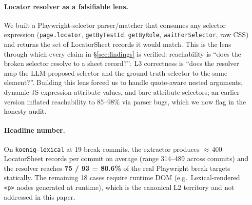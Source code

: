 \paragraph{Locator resolver as a falsifiable lens.}
We built a Playwright-selector parser/matcher that consumes any selector expression (\texttt{page.locator}, \texttt{getByTestId}, \texttt{getByRole}, \texttt{waitForSelector}, raw CSS) and returns the set of LocatorSheet records it would match. This is the lens through which every claim in \S\ref{sec:findings} is verified: reachability is ``does the broken selector resolve to a sheet record?''; L3 correctness is ``does the resolver map the LLM-proposed selector and the ground-truth selector to the same element?''. Building this lens forced us to handle quote-aware nested arguments, dynamic JS-expression attribute values, and bare-attribute selectors; an earlier version inflated reachability to 85--98\% via parser bugs, which we now flag in the honesty audit.

\paragraph{Headline number.}
On \texttt{koenig-lexical} at 19 break commits, the extractor produces $\approx$\,400 LocatorSheet records per commit on average (range 314--489 across commits) and the resolver reaches \textbf{75 / 93 = 80.6\%} of the real Playwright break targets statically. The remaining 18 cases require runtime DOM (e.g.\ Lexical-rendered \texttt{<p>} nodes generated at runtime), which is the canonical L2 territory and not addressed in this paper.
